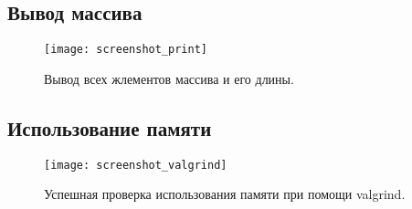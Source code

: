 \subsection{Вывод массива}
\begin{figure}[H]
  \centering
  \texttt{[image: screenshot\_print]}
  \caption{Вывод всех жлементов массива и его длины.}
\end{figure}

\subsection{Использование памяти}
\begin{figure}[H]
  \centering
  \texttt{[image: screenshot\_valgrind]}
  \caption{Успешная проверка использования памяти при помощи valgrind.}
\end{figure}
